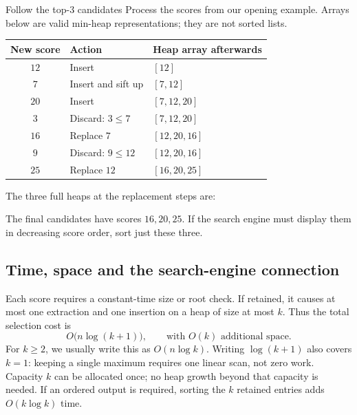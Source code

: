 \documentclass[a4paper,12pt,oneside]{report}
\begin{document}
\begin{framedexample}{Follow the top-$3$ candidates}\label{ex:heap-top-three}
Process the scores from our opening example. Arrays below are
valid min-heap representations; they are not sorted lists.
\begin{center}
\small
\begin{tabular}{cll}
\hline
New score & Action & Heap array afterwards \\
\hline
$12$ & Insert & $[12]$ \\
$7$  & Insert and sift up & $[7,12]$ \\
$20$ & Insert & $[7,12,20]$ \\
$3$  & Discard: $3\leq7$ & $[7,12,20]$ \\
$16$ & Replace $7$ & $[12,20,16]$ \\
$9$  & Discard: $9\leq12$ & $[12,20,16]$ \\
$25$ & Replace $12$ & $[16,20,25]$ \\
\hline
\end{tabular}
\end{center}
The three full heaps at the replacement steps are:
\begin{center}
\end{center}
The final candidates have scores $16,20,25$. If the search engine
must display them in decreasing score order, sort just these three.
\end{framedexample}

\subsection{Time, space and the search-engine connection}

Each score requires a constant-time size or root check. If retained,
it causes at most one extraction and one insertion on a heap of
size at most $k$. Thus the total selection cost is
\[
  O\bigl(n\log(k+1)\bigr),
  \qquad\text{with }O(k)\text{ additional space}.
\]
For $k\geq2$, we usually write this as $O(n\log k)$.
Writing $\log(k+1)$ also covers $k=1$: keeping a single maximum
requires one linear scan, not zero work.
Capacity $k$ can be allocated once; no heap growth beyond that
capacity is needed. If an ordered output is required, sorting the
$k$ retained entries adds $O(k\log k)$ time.
\end{document}
